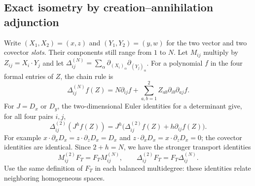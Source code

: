 \documentclass[10pt,a4paper]{article}
\begin{document}
\subsection{Exact isometry by creation--annihilation adjunction}
Write $(X_1,X_2)=(x,z)$ and $(Y_1,Y_2)=(y,w)$ for the two vector and
two covector \emph{slots}. Their components still range from $1$ to $N$.
Let $M_{ij}$ multiply by $Z_{ij}=X_i\cdot Y_j$ and let
$\Delta_{ij}^{(N)}=\sum_\alpha
\partial_{(X_i)_\alpha}\partial_{(Y_j)_\alpha}$.
For a polynomial $f$ in the four formal entries of $Z$, the chain rule is
\begin{equation}\label{eq:radial}
 \Delta_{ij}^{(N)}f(Z)=
 N\partial_{ij}f+\sum_{a,b=1}^{2}Z_{ab}\partial_{ib}\partial_{aj}f.
\end{equation}
For $J=D_x$ or $D_y$, the two-dimensional Euler identities for a
determinant give, for all four pairs $i,j$,
\begin{equation}\label{eq:detderivative}
 \Delta_{ij}^{(2)}(J^hf(Z))
 =J^h\bigl(\Delta_{ij}^{(2)}f(Z)+h\partial_{ij}f(Z)\bigr).
\end{equation}
For example $x\cdot\partial_xD_x=z\cdot\partial_zD_x=D_x$ and
$z\cdot\partial_xD_x=x\cdot\partial_zD_x=0$; the covector identities
are identical. Since $2+h=N$, we have the stronger transport identities
\begin{equation}\label{eq:laddertransport}
 M_{ij}^{(2)}F_T=F_TM_{ij}^{(N)},\qquad
 \Delta_{ij}^{(2)}F_T=F_T\Delta_{ij}^{(N)}.
\end{equation}
Use the same definition of $F_T$ in each balanced multidegree: these
identities relate neighboring homogeneous spaces.
\end{document}
